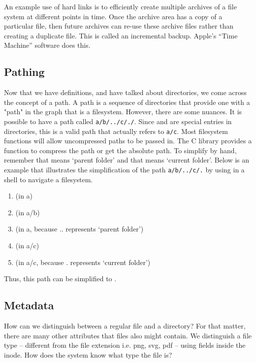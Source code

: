 An example use of hard links is to efficiently create multiple archives of a file system at different points in time.
Once the archive area has a copy of a particular file, then future archives can re-use these archive files rather than creating a duplicate file.
This is called an incremental backup.
Apple's ``Time Machine'' software does this.

\subsection{Pathing}

Now that we have definitions, and have talked about directories, we come across the concept of a path.
A path is a sequence of directories that provide one with a "path" in the graph that is a filesystem.
However, there are some nuances.
It is possible to have a path called \texttt{a/b/../c/./}.
Since  and  are special entries in directories, this is a valid path that actually refers to \texttt{a/c}.
Most filesystem functions will allow uncompressed paths to be passed in.
The C library provides a function  to compress the path or get the absolute path.
To simplify by hand, remember that  means `parent folder' and that  means `current folder'.
Below is an example that illustrates the simplification of the path \texttt{a/b/../c/.} by using  in a shell to navigate a filesystem.

\begin{enumerate}
  \item {} (in a)
  \item {} (in a/b)
  \item {} (in a, because .. represents `parent folder')
  \item {} (in a/c)
  \item {} (in a/c, because . represents `current folder')
\end{enumerate}

Thus, this path can be simplified to .

\subsection{Metadata}

How can we distinguish between a regular file and a directory?
For that matter, there are many other attributes that files also might contain.
We distinguish a file type -- different from the file extension i.e. png, svg, pdf -- using fields inside the inode.
How does the system know what type the file is?

